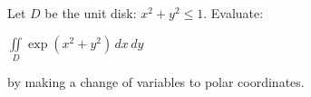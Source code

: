 \noindent Let $D$ be the unit disk: $x^2+y^2 \leq 1$. Evaluate:

\begin{center}
    $\displaystyle\iint\limits_D \exp(x^2 + y^2) \, dx \, dy$
\end{center}

\noindent by making a change of variables to polar coordinates.
